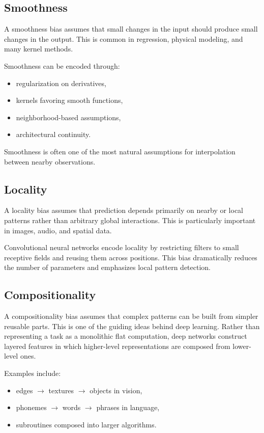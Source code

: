 \subsection{Smoothness}

A smoothness bias assumes that small changes in the input should produce small changes in the output. This is common in regression, physical modeling, and many kernel methods.

Smoothness can be encoded through:
\begin{itemize}
    \item regularization on derivatives,
    \item kernels favoring smooth functions,
    \item neighborhood-based assumptions,
    \item architectural continuity.
\end{itemize}

Smoothness is often one of the most natural assumptions for interpolation between nearby observations.

\subsection{Locality}

A locality bias assumes that prediction depends primarily on nearby or local patterns rather than arbitrary global interactions. This is particularly important in images, audio, and spatial data.

Convolutional neural networks encode locality by restricting filters to small receptive fields and reusing them across positions. This bias dramatically reduces the number of parameters and emphasizes local pattern detection.

\subsection{Compositionality}

A compositionality bias assumes that complex patterns can be built from simpler reusable parts. This is one of the guiding ideas behind deep learning. Rather than representing a task as a monolithic flat computation, deep networks construct layered features in which higher-level representations are composed from lower-level ones.

Examples include:
\begin{itemize}
    \item edges $\to$ textures $\to$ objects in vision,
    \item phonemes $\to$ words $\to$ phrases in language,
    \item subroutines composed into larger algorithms.
\end{itemize}

